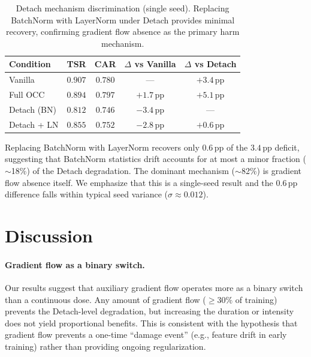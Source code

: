 \documentclass[letterpaper]{article}
\newcommand{\pp}{\,\textrm{pp}}
\begin{document}
\begin{table}[h]
\centering
\caption{Detach mechanism discrimination (single seed). Replacing BatchNorm with LayerNorm under Detach provides minimal recovery, confirming gradient flow absence as the primary harm mechanism.}
\label{tab:detach_ln}
\small
\begin{tabular}{lcccc}
\toprule
\textbf{Condition} & \textbf{TSR} & \textbf{CAR} & \textbf{$\Delta$ vs Vanilla} & \textbf{$\Delta$ vs Detach} \\
\midrule
Vanilla       & $0.907$ & $0.780$ & ---       & $+3.4\pp$ \\
Full OCC      & $0.894$ & $0.797$ & $+1.7\pp$ & $+5.1\pp$ \\
Detach (BN)   & $0.812$ & $0.746$ & $-3.4\pp$ & --- \\
Detach + LN   & $0.855$ & $0.752$ & $-2.8\pp$ & $+0.6\pp$ \\
\bottomrule
\end{tabular}
\end{table}

Replacing BatchNorm with LayerNorm recovers only $0.6\pp$ of the $3.4\pp$ deficit, suggesting that BatchNorm statistics drift accounts for at most a minor fraction ($\sim$18\%) of the Detach degradation.
The dominant mechanism ($\sim$82\%) is gradient flow absence itself.
We emphasize that this is a single-seed result and the $0.6\pp$ difference falls within typical seed variance ($\sigma \approx 0.012$).


\section{Discussion}
\label{sec:discussion}

\paragraph{Gradient flow as a binary switch.}
Our results suggest that auxiliary gradient flow operates more as a binary switch than a continuous dose.
Any amount of gradient flow ($\geq 30\%$ of training) prevents the Detach-level degradation, but increasing the duration or intensity does not yield proportional benefits.
This is consistent with the hypothesis that gradient flow prevents a one-time ``damage event'' (e.g., feature drift in early training) rather than providing ongoing regularization.
\end{document}

